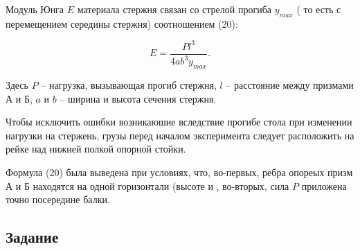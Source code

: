 \documentclass[a4paper, 12pt]{article}%
\begin{document}
Модуль Юнга $E$ материала стержня связан со стрелой прогиба $y_{max}$ ( то есть с перемещением середины стержня) соотношением (20):

\[ E = \frac{Pl^3}{4ab^3y_{max}}.\]

Здесь $P$ -- нагрузка, вызывающая прогиб стержня, $l$ -- расстояние между призмами А и Б, $a$ и $b$ -- ширина и высота сечения стержня.

Чтобы исключить ошибки возникаюшие вследствие прогибе стола при изменении нагрузки на стержень, грузы перед началом эксперимента следует расположить на рейке над нижней полкой опорной стойки.

Формула (20) была выведена при условиях, что, во-первых, ребра опореых призм А и Б находятся на одной горизонтали (высоте и , во-вторых, сила $P$ приложена точно посередине балки.

\begin{center} 
\section{Задание}
\end{center}


\begin{figure}[h]
\end{figure}
\end{document}
